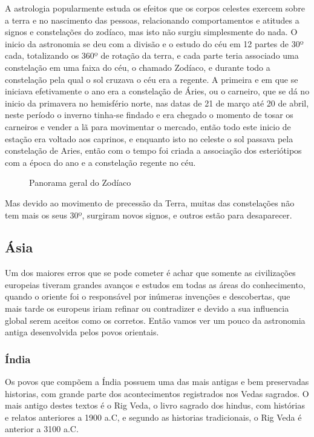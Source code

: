 A astrologia popularmente estuda os efeitos que os corpos celestes exercem sobre a terra e no nascimento das pessoas, relacionando comportamentos e atitudes a signos e constelações do zodíaco, mas isto não surgiu simplesmente do nada. O inicio da astronomia se deu com a divisão e o estudo do céu em 12 partes de 30º cada, totalizando os 360º de rotação da terra, e cada parte teria associado uma constelação em uma faixa do céu, o chamado Zodíaco, e durante todo a constelação pela qual o sol cruzava o céu era a regente. A primeira e em que se iniciava efetivamente o ano era a constelação de Áries, ou o carneiro, que se dá no inicio da primavera no hemisfério norte, nas datas de 21 de março até 20 de abril, neste período o inverno tinha-se findado e era chegado o momento de tosar os carneiros e vender a lã para movimentar o mercado, então todo este inicio de estação era voltado aos caprinos, e enquanto isto no celeste o sol passava pela constelação de Aries, então com o tempo foi criada a associação dos esteriótipos com a época do ano e a constelação regente no céu.

\begin{figure}[h!]
\centering
{} 

\caption{Panorama geral do Zodíaco}
\end{figure}

Mas devido ao movimento de precessão da Terra, muitas das constelações não tem mais os seus 30º, surgiram novos signos, e outros estão para desaparecer.
\subsection*{Ásia}
Um dos maiores erros que se pode cometer é achar que somente as civilizações europeias tiveram grandes avanços e estudos em todas as áreas do conhecimento, quando o oriente foi o responsável por inúmeras invenções e descobertas, que mais tarde os europeus iriam refinar ou contradizer e devido a sua influencia global serem aceitos como os corretos. Então vamos ver um pouco da astronomia antiga desenvolvida pelos povos orientais.
\subsubsection*{Índia}
Os povos que compõem a Índia possuem uma das mais antigas e bem preservadas historias, com grande parte dos acontecimentos registrados nos Vedas sagrados. O mais antigo destes textos é o Rig Veda, o livro sagrado dos hindus, com histórias e relatos anteriores a 1900 a.C, e segundo as historias tradicionais, o Rig Veda é anterior a 3100 a.C.


